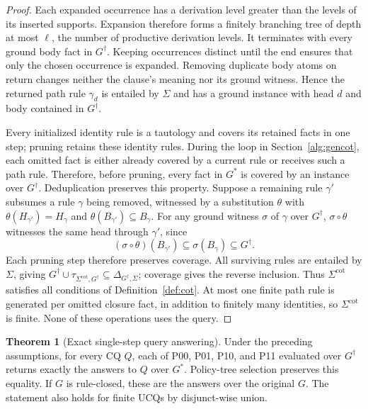 \documentclass[conference]{IEEEtran}
\theoremstyle{definition}
\newtheorem{theorem}{Theorem}
\newcommand{\Gc}{G^{\dagger}}
\newcommand{\Sig}{\Sigma}
\newcommand{\Sigcot}{\Sig^{\mathrm{cot}}}
\newcommand{\algref}[1]{Section~\ref{#1}}
\begin{document}
\begin{proof}
Each expanded occurrence has a derivation level greater than the
levels of its inserted supports. Expansion therefore forms a
finitely branching tree of depth at most $\ell$, the number of
productive derivation levels. It terminates with every ground body
fact in $\Gc$. Keeping occurrences distinct until the end ensures
that only the chosen occurrence is expanded. Removing duplicate
body atoms on return changes neither the clause's meaning nor its
ground witness. Hence the returned path rule $\gamma_d$ is
entailed by $\Sig$ and has a ground instance with head $d$ and
body contained in $\Gc$.

Every initialized identity rule is a tautology and covers its
retained facts in one step; pruning retains these identity rules.
During the loop in
\algref{alg:gencot}, each omitted fact is either already
covered by a current rule or receives such a path rule. Therefore,
before pruning, every fact in $G^{*}$ is covered by an instance
over $\Gc$. Deduplication preserves this property.
Suppose a remaining rule $\gamma'$ subsumes a rule $\gamma$
being removed, witnessed by a substitution $\theta$ with
$\theta(H_{\gamma'})=H_\gamma$ and
$\theta(B_{\gamma'})\subseteq B_\gamma$.
For any ground witness $\sigma$ of $\gamma$ over $\Gc$,
$\sigma\circ\theta$ witnesses the same head through $\gamma'$,
since
\[
(\sigma\circ\theta)(B_{\gamma'})
 \subseteq\sigma(B_\gamma)\subseteq\Gc.
\]
Each pruning step therefore preserves coverage. All surviving
rules are entailed by $\Sig$, giving
$\Gc\cup\tau_{\Sigcot,\Gc}\subseteq\Delta_{\Gc,\Sig}$;
coverage gives the reverse inclusion. Thus $\Sigcot$ satisfies all
conditions of Definition~\ref{def:cot}. At most one finite path
rule is generated per omitted closure fact, in addition to finitely
many identities, so $\Sigcot$ is finite. None of these operations
uses the query.
\end{proof}

\begin{theorem}[Exact single-step query answering]
\label{thm:queryeq}
Under the preceding assumptions, for every CQ $Q$, each of P00, P01,
P10, and P11 evaluated over $\Gc$ returns exactly the answers to $Q$
over $G^{*}$. Policy-tree selection preserves this equality. If
$G$ is rule-closed, these are the answers over the original $G$.
The statement also holds for finite UCQs by disjunct-wise union.
\end{theorem}
\end{document}
